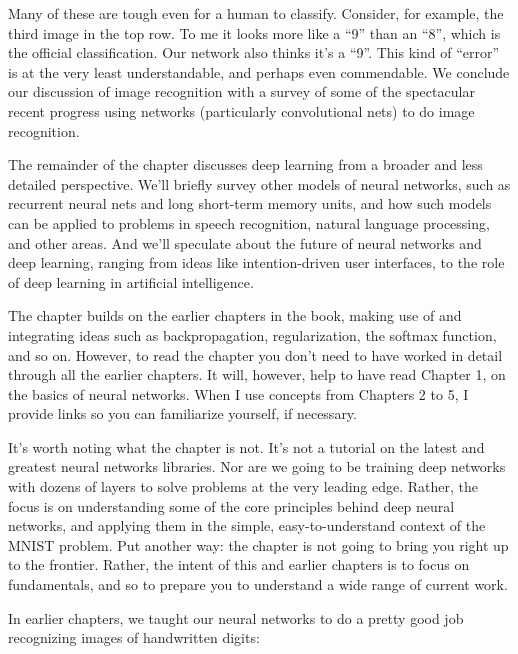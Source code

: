 \noindent Many of these are tough even for a human to classify. Consider, for example, the third image in the top row. To me it looks more like a ``9'' than an ``8'', which is the official classification. Our network also thinks it's a ``9''. This kind of ``error'' is at the very least understandable, and perhaps even commendable. We conclude our discussion of image recognition with a survey of some of the spectacular recent progress using networks (particularly convolutional nets) to do image recognition.


The remainder of the chapter discusses deep learning from a broader and less detailed perspective. We'll briefly survey other models of neural networks, such as recurrent neural nets and long short-term memory units, and how such models can be applied to problems in speech recognition, natural language processing, and other areas. And we'll speculate about the future of neural networks and deep learning, ranging from ideas like intention-driven user interfaces, to the role of deep learning in artificial intelligence.


The chapter builds on the earlier chapters in the book, making use of and integrating ideas such as backpropagation, regularization, the softmax function, and so on. However, to read the chapter you don't need to have worked in detail through all the earlier chapters. It will, however, help to have read Chapter 1, on the basics of neural networks. When I use concepts from Chapters 2 to 5, I provide links so you can familiarize yourself, if necessary.


It's worth noting what the chapter is not. It's not a tutorial on the latest and greatest neural networks libraries. Nor are we going to be training deep networks with dozens of layers to solve problems at the very leading edge. Rather, the focus is on understanding some of the core principles behind deep neural networks, and applying them in the simple, easy-to-understand context of the MNIST problem. Put another way: the chapter is not going to bring you right up to the frontier. Rather, the intent of this and earlier chapters is to focus on fundamentals, and so to prepare you to understand a wide range of current work.





In earlier chapters, we taught our neural networks to do a pretty good job recognizing images of handwritten digits:

